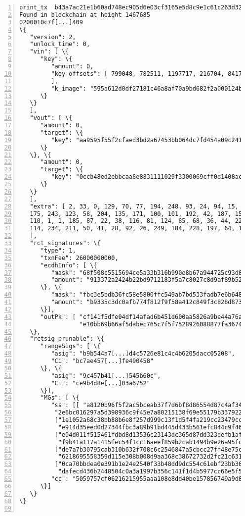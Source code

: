 \begin{appendices}
\begin{Verbatim}[commandchars=\\\{\}, numbers=left]
print_tx  b43a7ac21e1b60ad748ec905d6e03cf3165e5d8c9e1c61c263d328118c42eaa6 
Found in blockchain at height 1467685
0200010c7f[...]409
\{
   "version": 2,
   "unlock_time": 0, 
   "vin": [ \{
      "key": \{
         "amount": 0, 
         "key_offsets": [ 799048, 782511, 1197717, 216704, 841722
         ], 
         "k_image": "595a612d0df27181c46a8af70a9bd682f2a000124b873ba5d2b9f4b4e4efd672"
      \}
   \}
   ], 
   "vout": [ \{
      "amount": 0, 
      "target": \{
         "key": "aa9595f55f2cfaed3bd2a67453bb064dc7fd454a09c2418d7338782790185fe3"
      \}
   \}, \{
      "amount": 0, 
      "target": \{
         "key": "0ccb48ed2ebbcaa8e8831111029f3300069cff0d1408acffbfc3810b362ea217"
      \}
   \}
   ], 
   "extra": [ 2, 33, 0, 129, 70, 77, 194, 248, 93, 24, 94, 15, 107, 233, 0, 229, 82, 
   175, 243, 123, 58, 204, 135, 171, 100, 101, 192, 42, 187, 157, 168, 222, 98, 192, 
   110, 1, 1, 185, 87, 22, 38, 116, 81, 124, 85, 68, 36, 44, 229, 235, 46, 159, 139, 
   114, 234, 211, 50, 41, 28, 92, 26, 249, 184, 228, 197, 64, 139, 5
   ], 
   "rct_signatures": \{
      "type": 1, 
      "txnFee": 26000000000, 
      "ecdhInfo": [ \{
         "mask": "68f508c5515694ce5a33b316b990e8b67a944725c93d806767e61b2e0b13d300", 
         "amount": "913372a2424b22bd9712183f5a7c8027c8d9af89b52d1e7d06fd1f87a1e5d20d"
      \}, \{
         "mask": "fbc3e5bdb36fc58e5800ffc549ab7bd533fadb7e6b64898c82ea620d749fc80e", 
         "amount": "b9335c3dc0afb774f812f9f58a412c849f3c828d873f1c16ab102963799d9809"
      \}], 
      "outPk": [ "cf141f5dfe04df14afad6b451d600aa5826a9be44a76a1630850c1d5951d482e",
                 "e10bb69b66af5dabec765c7f5f7528926088877fa36746833828a0575896ae57"]
   \}, 
   "rctsig_prunable": \{
      "rangeSigs": [ \{
         "asig": "b9b544a7[...]d4c5726e81c4c4b6205dacc05208", 
         "Ci": "bc7ae457[...]fe490458"
      \}, \{
         "asig": "9c457b41[...]545b60c", 
         "Ci": "ce9b4d8e[...]03a6752"
      \}], 
      "MGs": [ \{
         "ss": [[ "a8120b96f5f2ac5bceab37f7d6bf8d86554d87c4af3441007cad92f54a24d908",
          "2e6bc016297a5d398936c9f45e7a80215138f69e55179b337922e2d51c1a9f00"], 
          ["1e1052a68c38bb88b6e8f257d999c13f1d5f4fa219cc23479ccbfa6b14b5960a",
           "e914d35eed0d27344fbc3a89b91bd445d433b561efc844c9f466a61ebb5f6d09"], 
          ["e04d011f515461fdbd8d13536c23143dc365d87dd323defb1af834e540a8fc0e",
           "f9b41a117a1415fec54f1cc16aeef859b2cab1494b9e26a95fc9eaf4f571fa00"], 
          ["de7a7b30795cab310b632f708c6c2546847a5cbcc27ff48e75c1556c3f6f180c",
           "6218695558359d115e308b008d9aa368c38672732d2fc21c6317ad7d15918c05"], 
          ["0ca70bbdea0e391b1e24e2540f33b48dd9dc554c61ebf23bb3691aab5094e40f",
           "dafecd436b2448504c0a3a1997b356c141f1d4b5977cc66e5f55592f13731501"]],        
         "cc": "5059757cf06216215955aaa108e8dd40be157856749a9d883bcac611e395a409"
      \}]
   \}
\}


\end{Verbatim}
\end{appendices}
